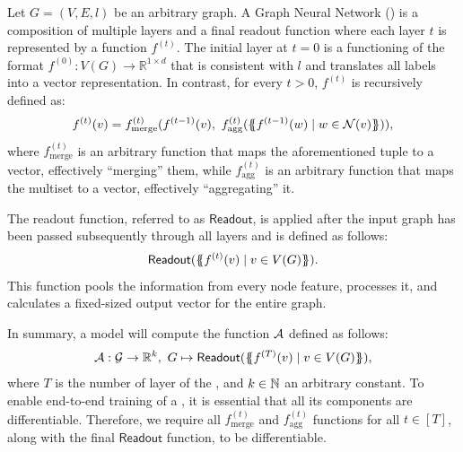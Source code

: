 \begin{definition}\label{def:gnn}
    Let $G = (V, E, l)$ be an arbitrary graph. A \textsf{Graph Neural Network} (\gnn) is a composition of multiple layers and a final readout function where each layer $t$ is represented by a function $f^{(t)}$. The initial layer at $t=0$ is a functioning of the format $f^{(0)}: V(G) \rightarrow \mathbb{R}^{1 \times d}$ that is consistent with $l$ and translates all labels into a vector representation. In contrast, for every $t > 0$, $f^{(t)}$ is recursively defined as:
    \begin{align*}
        f^{(t)}(v) = f^{(t)}_{\text{merge}} (f^{(t-1)}(v), \  f^{(t)}_{\text{agg}}( \{\!\!\{ f^{(t-1)}(w) \mid w \in \mathcal{N}(v) \}\!\!\} )),
    \end{align*}
    where $f^{(t)}_{\text{merge}}$ is an arbitrary function that maps the aforementioned tuple to a vector, effectively ``merging'' them, while $f^{(t)}_{\text{agg}}$ is an arbitrary function that maps the multiset to a vector, effectively ``aggregating'' it.
    
    The readout function, referred to as $\textsf{Readout}$, is applied after the input graph has been passed subsequently through all layers and is defined as follows:
    \begin{align*}
        \textsf{Readout}(\{\!\!\{ f^{(t)}(v) \mid v \in V(G) \}\!\!\}).
    \end{align*}
    This function pools the information from every node feature, processes it, and calculates a fixed-sized output vector for the entire graph.
    
    In summary, a \gnn model will compute the function $\mathcal{A}$ defined as follows:
    \begin{align*}
        \mathcal{A}: \mathcal{G} \rightarrow \mathbb{R}^k, \ G \mapsto \textsf{Readout}(\{\!\!\{ f^{(T)}(v) \mid v \in V(G) \}\!\!\}),
    \end{align*}
    where $T$ is the number of layer of the \gnn, and $k \in \mathbb{N}$ an arbitrary constant. To enable end-to-end training of a \gnn, it is essential that all its components are differentiable. Therefore, we require all $f^{(t)}_{\text{merge}}$ and $f^{(t)}_{\text{agg}}$ functions for all $t \in [T]$, along with the final $\textsf{Readout}$ function, to be differentiable.
\end{definition}
